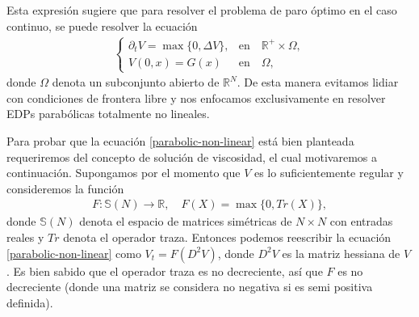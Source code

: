 \documentclass{article}
\numberwithin{equation}{section}
\begin{document}
Esta expresión sugiere que para resolver el problema de paro 
óptimo en el caso continuo, se puede resolver la ecuación
\begin{align}\label{parabolic-non-linear}
\left\{
\begin{array}{cc}
    \partial_t V = \max\{0,\Delta V\}, & \text{en} \quad  \mathbb{R}^+\times \Omega, \\
    V(0,x) = G(x) & \text{en} \quad \Omega,
\end{array}
\right.
\end{align}
donde $\Omega$ denota un subconjunto abierto de $\mathbb{R}^N$.
De esta manera evitamos lidiar con condiciones de frontera libre y nos enfocamos exclusivamente en resolver EDPs parabólicas totalmente no lineales. 

Para probar que la ecuación \eqref{parabolic-non-linear} está bien planteada requeriremos del concepto de  solución de viscosidad, el cual motivaremos a continuación. Supongamos por el momento que $V$ es lo suficientemente regular y consideremos la función 
\begin{align*}
F : \mathbb{S}(N) \to \mathbb{R}, \quad F(X) = \max\{0,Tr(X)\}, 
\end{align*}
donde $\mathbb{S}(N)$ denota el espacio de matrices simétricas de $N\times N$ con entradas reales y $Tr$ denota el operador traza.  Entonces podemos reescribir la ecuación \eqref{parabolic-non-linear} como $V_t = F(D^2V)$, donde $D^2V$ es la matriz hessiana de $V$. Es bien sabido que el operador traza es no decreciente, así que $F$ es no decreciente (donde una matriz se considera no negativa si es semi positiva definida). 
\end{document}
